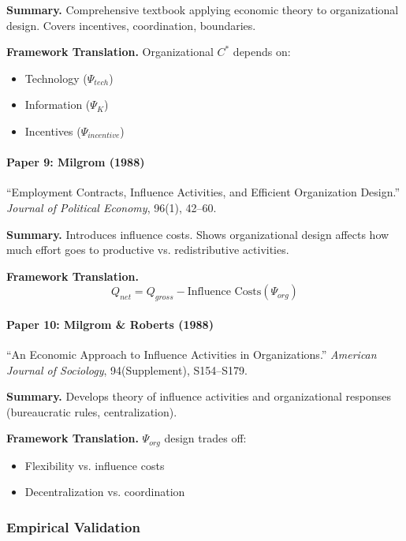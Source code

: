 \textbf{Summary.}
Comprehensive textbook applying economic theory to organizational design. 
Covers incentives, coordination, boundaries.

\textbf{Framework Translation.}
Organizational $C^*$ depends on:
\begin{itemize}
    \item Technology ($\Psi_{tech}$)
    \item Information ($\Psi_K$)
    \item Incentives ($\Psi_{incentive}$)
\end{itemize}

\paragraph{Paper 9: Milgrom (1988)}

``Employment Contracts, Influence Activities, and Efficient Organization Design.''
\textit{Journal of Political Economy}, 96(1), 42--60.

\textbf{Summary.}
Introduces influence costs. Shows organizational design affects how much 
effort goes to productive vs. redistributive activities.

\textbf{Framework Translation.}
\begin{equation}
Q_{net} = Q_{gross} - \text{Influence Costs}(\Psi_{org})
\end{equation}

\paragraph{Paper 10: Milgrom \& Roberts (1988)}

``An Economic Approach to Influence Activities in Organizations.''
\textit{American Journal of Sociology}, 94(Supplement), S154--S179.

\textbf{Summary.}
Develops theory of influence activities and organizational responses 
(bureaucratic rules, centralization).

\textbf{Framework Translation.}
$\Psi_{org}$ design trades off:
\begin{itemize}
    \item Flexibility vs. influence costs
    \item Decentralization vs. coordination
\end{itemize}

\subsubsection{Empirical Validation}

